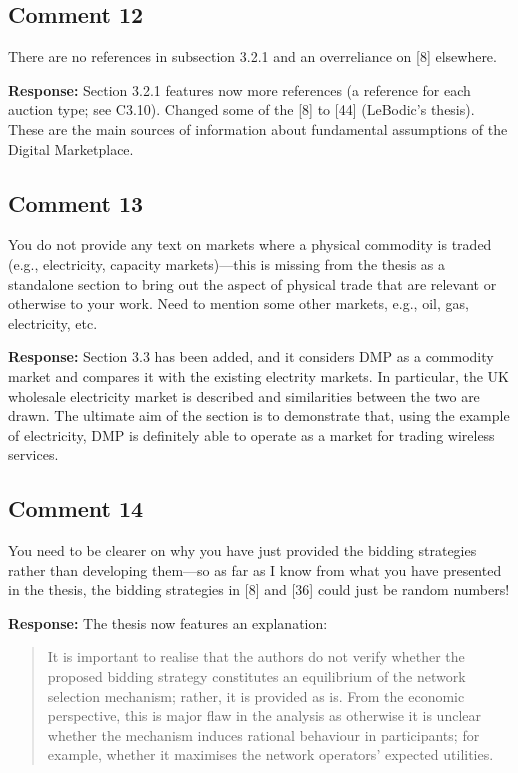 \documentclass[10pt,a4paper,notitlepage]{article}
\numberwithin{equation}{section}
\begin{document}
\subsection{Comment 12}
There are no references in subsection 3.2.1 and an overreliance on [8] elsewhere.

\textbf{Response:}
Section 3.2.1 features now more references (a reference for each auction type; see C3.10). Changed some of the [8] to [44] (LeBodic's thesis). These are the main sources of information about fundamental assumptions of the Digital Marketplace.

\subsection{Comment 13}
You do not provide any text on markets where a physical commodity is traded (e.g., electricity, capacity markets)---this is missing from the thesis as a standalone section to bring out the aspect of physical trade that are relevant or otherwise to your work. Need to mention some other markets, e.g., oil, gas, electricity, etc.

\textbf{Response:}
Section 3.3 has been added, and it considers DMP as a commodity market and compares it with the existing electrity markets. In particular, the UK wholesale electricity market is described and similarities between the two are drawn. The ultimate aim of the section is to demonstrate that, using the example of electricity, DMP is definitely able to operate as a market for trading wireless services. 

\subsection{Comment 14}
You need to be clearer on why you have just provided the bidding strategies rather than developing them---so as far as I know from what you have presented in the thesis, the bidding strategies in [8] and [36] could just be random numbers!

\textbf{Response:}
The thesis now features an explanation:
\begin{quote}
It is important to realise that the authors do not verify whether the proposed bidding strategy constitutes an equilibrium of the network selection mechanism; rather, it is provided as is. From the economic perspective, this is major flaw in the analysis as otherwise it is unclear whether the mechanism induces rational behaviour in participants; for example, whether it maximises the network operators' expected utilities.
\end{quote}
\end{document}
